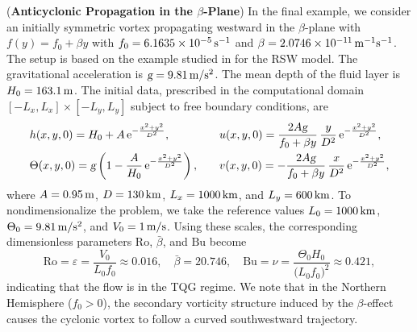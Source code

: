 \documentclass[a4paper,11pt,twoside]{article}
\numberwithin{equation}{section}
\numberwithin{figure}{section}
\numberwithin{table}{section}
\newcommand{\eps}{\varepsilon}
\newcommand{\g}{\textsl{g}}
\newcommand{\Ro}{\mathrm{Ro}}
\newcommand{\Bu}{\mathrm{Bu}}
\begin{document}
\begin{example}({\bf Anticyclonic Propagation in the $\beta$-Plane})
In the final example, we consider an initially symmetric vortex propagating westward in the $\beta$-plane with $f(y)=f_0+\beta y$ with
$f_0=6.1635\times10^{-5}\,{\rm s^{-1}}$ and $\beta=2.0746\times10^{-11}\,{\rm m^{-1}s^{-1}}$. The setup is based on the example studied in
\cite{LeRoux_2008,Zhang_2026} for the RSW model. The gravitational acceleration is $\g=9.81\,{\rm m/s^2}$. The mean depth of the fluid layer
is $H_0=163.1\,{\rm m}$. The initial data, prescribed in the computational domain $[-L_x,L_x]\times[-L_y,L_y]$ subject to free boundary
conditions, are
\begin{equation*}
\begin{aligned}
&h(x,y,0)=H_0+A\,{\rm e}^{-\frac{x^2+y^2}{D^2}},\quad&&u(x,y,0)=\frac{2A\g}{f_0+\beta y}\,\frac{y}{D^2}\,{\rm e}^{-\frac{x^2+y^2}{D^2}},\\
&\Theta(x,y,0)=\g\left(1-\frac{A}{H_0}\,{\rm e}^{-\frac{x^2+y^2}{D^2}}\right),\quad
&&v(x,y,0)=-\frac{2A\g}{f_0+\beta y}\,\frac{x}{D^2}\,{\rm e}^{-\frac{x^2+y^2}{D^2}},
\end{aligned}
\end{equation*}
where $A=0.95\,{\rm m}$, $D=130\,{\rm km}$, $L_x=1000\,{\rm km}$, and $L_y=600\,{\rm km}$. To nondimensionalize the problem, we take the
reference values $L_0=1000\,{\rm km}$, $\Theta_0=9.81\,{\rm m/s^2}$, and $V_0=1\,{\rm m/s}$. Using these scales, the corresponding
dimensionless parameters $\Ro$, $\bar\beta$, and $\Bu$ become
\begin{equation*}
\Ro=\eps=\frac{V_0}{L_0f_0}\approx0.016,\quad\bar\beta=20.746,\quad\Bu=\nu=\frac{\Theta_0H_0}{\big(L_0f_0\big)^2}\approx0.421,
\end{equation*}
indicating that the flow is in the TQG regime. We note that in the Northern Hemisphere ($f_0>0$), the secondary vorticity structure induced
by the $\beta$-effect causes the cyclonic vortex to follow a curved southwestward trajectory.
	

\end{example}
\end{document}
